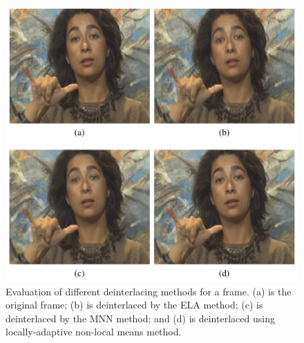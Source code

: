 \begin{figure}
    \centering
    \includegraphics[width=0.8\linewidth]{images/deinterlacing.png}
    \caption{Evaluation of different deinterlacing methods for a frame.
             (a) is the original frame;
             (b) is deinterlaced by the ELA method;
             (c) is deinterlaced by the MNN method; and
             (d) is deinterlaced using locally-adaptive non-local means method.}
    \label{fig:deinterlacing}
\end{figure}
